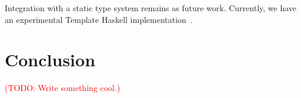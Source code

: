 \documentclass[acmlarge]{acmart}
\newcommand{\todo}[1]{\textcolor{red}{(TODO: #1)}}
\begin{document}
Integration with a static type system remains as future work.
Currently, we have an experimental Template Haskell implementation~\cite{egisonHaskell}.

\section{Conclusion}\label{conclusion}

\todo{Write something cool.}




\end{document}
